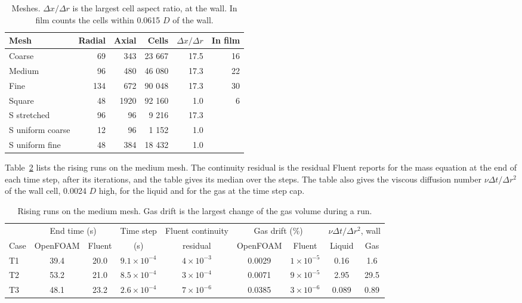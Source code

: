 \documentclass[11pt,a4paper]{article}
\begin{document}
\begin{table}[H]
\centering
\small
\caption{Meshes. $\Delta x/\Delta r$ is the largest cell aspect ratio, at the wall. In film counts the cells within 0.0615 $D$ of the wall.}
\label{tab:mesh}
\setlength{\tabcolsep}{3pt}
\begin{tabular}{lrrrrr}
\toprule
Mesh & Radial & Axial & Cells & $\Delta x/\Delta r$ & In film \\
\midrule
Coarse & 69 & 343 & 23 667 & 17.5 & 16 \\
Medium & 96 & 480 & 46 080 & 17.3 & 22 \\
Fine & 134 & 672 & 90 048 & 17.3 & 30 \\
Square & 48 & 1920 & 92 160 & 1.0 & 6 \\
S stretched & 96 & 96 & 9 216 & 17.3 & \\
S uniform coarse & 12 & 96 & 1 152 & 1.0 & \\
S uniform fine & 48 & 384 & 18 432 & 1.0 & \\
\bottomrule
\end{tabular}
\end{table}

Table~\ref{tab:runs} lists the rising runs on the medium mesh. The continuity residual is the residual Fluent reports for the mass equation at the end of each time step, after its iterations, and the table gives its median over the steps. The table also gives the viscous diffusion number $\nu\Delta t/\Delta r^2$ of the wall cell, 0.0024 $D$ high, for the liquid and for the gas at the time step cap.

\begin{table}[H]
\centering
\caption{Rising runs on the medium mesh. Gas drift is the largest change of the gas volume during a run.}
\label{tab:runs}
\small
\setlength{\tabcolsep}{3pt}
\begin{tabular}{lcccccccc}
\toprule
 & \multicolumn{2}{c}{End time (s)} & Time step & Fluent continuity & \multicolumn{2}{c}{Gas drift (\%)} & \multicolumn{2}{c}{$\nu\Delta t/\Delta r^2$, wall} \\
Case & OpenFOAM & Fluent & (s) & residual & OpenFOAM & Fluent & Liquid & Gas \\
\midrule
T1 & 39.4 & 20.0 & $9.1\times10^{-4}$ & $4\times10^{-3}$ & 0.0029 & $1\times10^{-5}$ & 0.16 & 1.6 \\
T2 & 53.2 & 21.0 & $8.5\times10^{-4}$ & $3\times10^{-4}$ & 0.0071 & $9\times10^{-5}$ & 2.95 & 29.5 \\
T3 & 48.1 & 23.2 & $2.6\times10^{-4}$ & $7\times10^{-6}$ & 0.0385 & $3\times10^{-6}$ & 0.089 & 0.89 \\
\bottomrule
\end{tabular}
\end{table}
\end{document}
